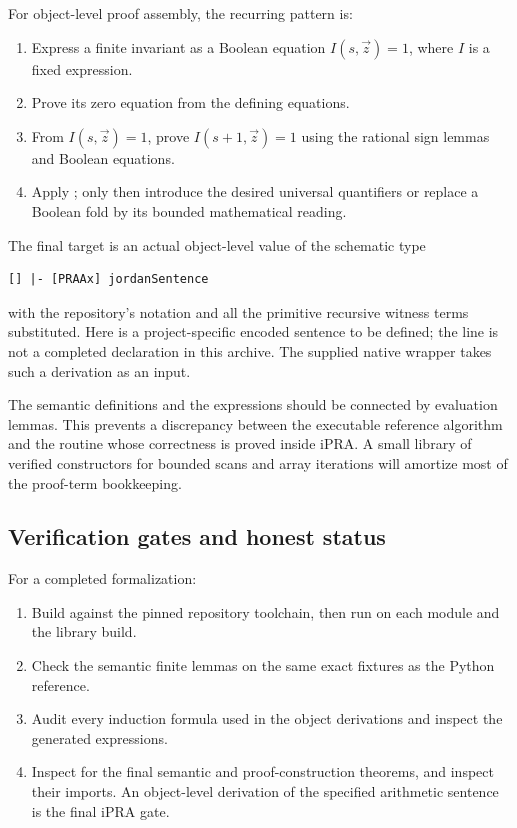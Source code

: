 For object-level proof assembly, the recurring pattern is:
\begin{enumerate}
\item Express a finite invariant as a Boolean equation
$I(s,\vec z)=1$, where $I$ is a fixed  expression.
\item Prove its zero equation from the defining equations.
\item From $I(s,\vec z)=1$, prove $I(s+1,\vec z)=1$ using
the rational sign lemmas and Boolean equations.
\item Apply ; only then introduce the
desired universal quantifiers or replace a Boolean fold
by its bounded mathematical reading.
\end{enumerate}
The final target is an actual object-level value of the schematic
type
\begin{lstlisting}
[] |- [PRAAx] jordanSentence
\end{lstlisting}
with the repository's notation and all the primitive recursive
witness terms substituted. Here  is a
project-specific encoded sentence to be defined; the line is
not a completed declaration in this archive.
The supplied native wrapper takes such a derivation as an input.

The semantic definitions and the  expressions should
be connected by evaluation lemmas. This prevents a discrepancy
between the executable reference algorithm and the routine
whose correctness is proved inside iPRA. A small library of
verified constructors for bounded scans and array iterations
will amortize most of the proof-term bookkeeping.

\subsection{Verification gates and honest status}

For a completed formalization:
\begin{enumerate}
\item Build against the pinned repository toolchain, then run
 on each module and the library build.
\item Check the semantic finite lemmas on the same exact
fixtures as the Python reference.
\item Audit every induction formula used in the object
derivations and inspect the generated  expressions.
\item Inspect  for the final semantic
and proof-construction theorems, and inspect their imports.
An object-level derivation of the specified arithmetic
sentence is the final iPRA gate.
\end{enumerate}

